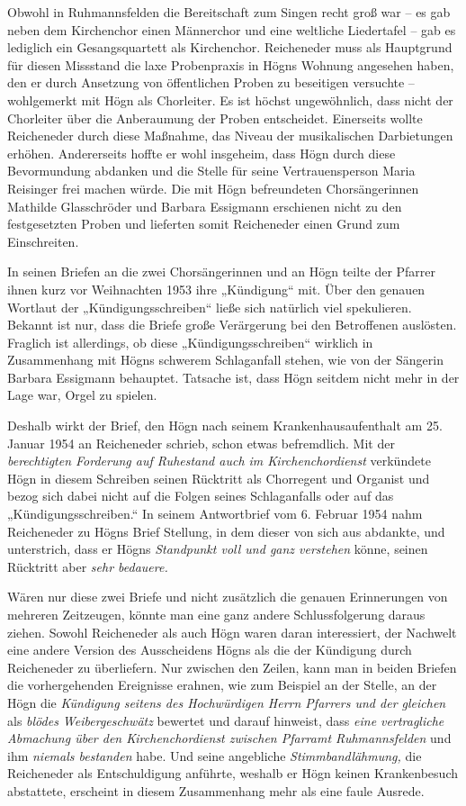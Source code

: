 \documentclass{book}
\newcommand{\zitat}[1]{\textit{#1}}
\begin{document}
Obwohl in Ruhmannsfelden die Bereitschaft zum Singen recht groß war – es
gab neben dem Kirchenchor einen Männerchor und eine weltliche
Lieder\-tafel – gab es lediglich ein Gesangsquartett als Kirchenchor.
Reicheneder muss als Hauptgrund für diesen Missstand die laxe
Probenpraxis in Högns Woh\-nung angesehen haben, den er durch Ansetzung
von öffentlichen Proben zu beseitigen versuchte – wohlgemerkt mit Högn
als Chorleiter. Es ist höchst ungewöhnlich, dass nicht der Chorleiter
über die Anberaumung der Proben entscheidet. Einerseits wollte
Reicheneder durch diese Maßnahme, das Niveau der musikalischen
Darbietungen erhöhen. Andererseits hoffte er wohl insge\-heim, dass
Högn durch diese Bevormundung abdanken und die Stelle für seine
Vertrauensperson Maria Reisinger frei machen würde. Die mit Högn
befreundeten Chorsängerinnen Mathilde Glasschröder und Barbara
Essig\-mann erschienen nicht zu den festgesetzten Proben und lieferten
somit Reicheneder einen Grund zum Einschreiten. 

In seinen Briefen an die zwei Chorsängerinnen und an Högn teilte der
Pfarrer ihnen kurz vor Weihnachten 1953 ihre „Kündigung“ mit. Über den
genauen Wortlaut der „Kündigungsschreiben“ ließe sich natürlich viel
spekulieren. Bekannt ist nur, dass die Briefe große Verärgerung bei den
Betroffenen auslösten. Fraglich ist allerdings, ob diese
„Kündigungsschreiben“ wirklich in Zusammenhang mit Högns schwerem
Schlaganfall stehen, wie von der Sängerin Barbara Essigmann behauptet.
Tatsache ist, dass Högn seitdem nicht mehr in der Lage war, Orgel zu
spielen.

Deshalb wirkt der Brief, den Högn nach seinem Krankenhausaufenthalt am
25. Januar 1954 an Reicheneder schrieb, schon etwas befremdlich. Mit
der \zitat{berechtigten Forderung auf Ruhestand auch im
Kirchenchordienst} verkündete Högn in diesem Schreiben seinen Rücktritt
als Chorregent und Organist und bezog sich dabei nicht auf die Folgen
seines Schlaganfalls oder auf das „Kündigungs\-schreiben.“ In seinem
Antwortbrief vom 6. Februar 1954 nahm Reicheneder zu Högns Brief
Stellung, in dem dieser von sich aus abdankte, und unterstrich, dass er
Högns \zitat{Standpunkt voll und ganz verstehen} könne,
seinen Rücktritt aber \zitat{sehr bedauere.}

Wären nur diese zwei Briefe und nicht zusätzlich die genauen
Erinnerun\-gen von mehreren Zeitzeugen, könnte man eine ganz andere
Schlussfolgerung daraus ziehen. Sowohl Reicheneder als auch Högn waren
daran interessiert, der Nachwelt eine andere Version des Ausscheidens
Högns als die der Kün\-digung durch Reicheneder zu überliefern. Nur
zwischen den Zeilen, kann man in beiden Briefen die vorhergehenden
Ereignisse erahnen, wie zum Beispiel an der Stelle, an der Högn die
\zitat{Kündigung seitens des Hochwürdigen Herrn Pfarrers und
der gleichen} als \zitat{blödes Weibergeschwätz} bewertet und
darauf hinweist, dass \zitat{eine vertrag\-liche Abmachung
über den Kirchenchordienst zwischen Pfarramt Ruhmannsfelden }und ihm
\textit{niemals bestanden} habe.\zitat{\textup{ }}Und seine
angebliche \zitat{Stimmbandlähmung, }die Rei\-cheneder als
Entschuldigung anführte, weshalb er Högn keinen Kranken\-besuch
abstattete, erscheint in diesem Zusammenhang mehr als eine faule
Ausrede.
\end{document}
